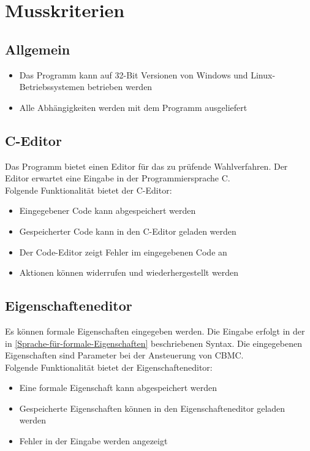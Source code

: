 \documentclass[a4paper]{scrreprt}
\begin{document}
\section{Musskriterien}
\subsection{Allgemein}
\begin{itemize}
\item Das Programm kann auf 32-Bit Versionen von Windows und Linux-Betriebssystemen betrieben werden
\item Alle Abhängigkeiten werden mit dem Programm ausgeliefert
\end{itemize}

\subsection{C-Editor}
Das Programm bietet einen Editor für das zu prüfende Wahlverfahren. Der Editor erwartet eine Eingabe in der Programmiersprache C.\\
Folgende Funktionalität bietet der C-Editor:
\begin{itemize}
	\item Eingegebener Code kann abgespeichert werden
	\item Gespeicherter Code kann in den C-Editor geladen werden
	\item Der Code-Editor zeigt Fehler im eingegebenen Code an
	\item Aktionen können widerrufen und wiederhergestellt werden
\end{itemize}
	
\subsection{Eigenschafteneditor}
Es können formale Eigenschaften eingegeben werden. Die Eingabe erfolgt in der in \ref{Sprache-für-formale-Eigenschaften} beschriebenen Syntax. Die eingegebenen Eigenschaften sind Parameter bei der Ansteuerung von \ac{CBMC}.\\
Folgende Funktionalität bietet der Eigenschafteneditor:
\begin{itemize}
	\item Eine formale Eigenschaft kann abgespeichert werden
	\item Gespeicherte Eigenschaften können in den Eigenschafteneditor geladen werden	
	\item Fehler in der Eingabe werden angezeigt
\end{itemize}
\end{document}
